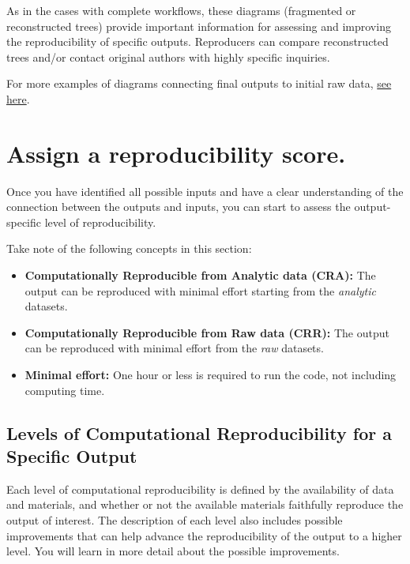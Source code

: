 \documentclass[
]{book}
\begin{document}
As in the cases with complete workflows, these diagrams (fragmented or reconstructed trees) provide important information for assessing and improving the reproducibility of specific outputs. Reproducers can compare reconstructed trees and/or contact original authors with highly specific inquiries.

For more examples of diagrams connecting final outputs to initial raw data, \protect\hyperlink{examples-of-reproduction-trees}{see here}.

\hypertarget{score}{%
\section{Assign a reproducibility score.}\label{score}}

Once you have identified all possible inputs and have a clear understanding of the connection between the outputs and inputs, you can start to assess the output-specific level of reproducibility.

Take note of the following concepts in this section:

\begin{itemize}
\item
  \textbf{Computationally Reproducible from Analytic data (CRA):} The output can be reproduced with minimal effort starting from the \emph{analytic} datasets.
\item
  \textbf{Computationally Reproducible from Raw data (CRR):} The output can be reproduced with minimal effort from the \emph{raw} datasets.
\item
  \textbf{Minimal effort:} One hour or less is required to run the code, not including computing time.
\end{itemize}

\hypertarget{levels-of-computational-reproducibility-for-a-specific-output}{%
\subsection{Levels of Computational Reproducibility for a Specific Output}\label{levels-of-computational-reproducibility-for-a-specific-output}}

Each level of computational reproducibility is defined by the availability of data and materials, and whether or not the available materials faithfully reproduce the output of interest. The description of each level also includes possible improvements that can help advance the reproducibility of the output to a higher level. You will learn in more detail about the possible improvements.
\end{document}
